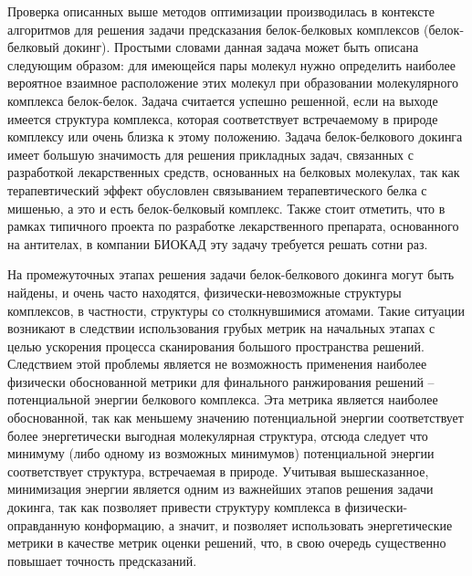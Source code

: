   Проверка описанных выше методов оптимизации производилась в контексте алгоритмов для решения задачи предсказания белок-белковых комплексов (белок-белковый докинг). Простыми словами данная задача может быть описана следующим образом: для имеющейся пары молекул нужно определить наиболее вероятное взаимное расположение этих молекул при образовании молекулярного комплекса белок-белок. Задача считается успешно решенной, если на выходе имеется структура комплекса, которая соответствует встречаемому в природе комплексу или очень близка к этому положению. Задача белок-белкового докинга имеет большую значимость для решения прикладных задач, связанных с разработкой лекарственных средств, основанных на белковых молекулах, так как терапевтический эффект обусловлен связыванием терапевтического белка с мишенью, а это и есть белок-белковый комплекс. Также стоит отметить, что в рамках типичного проекта по разработке лекарственного препарата, основанного на антителах, в компании БИОКАД эту задачу требуется решать сотни раз.

  На промежуточных этапах решения задачи белок-белкового докинга могут быть найдены, и очень часто находятся, физически-невозможные структуры комплексов, в частности, структуры со столкнувшимися атомами. Такие ситуации возникают в следствии использования грубых метрик на начальных этапах с целью ускорения процесса сканирования большого пространства решений. Следствием этой проблемы является не возможность применения наиболее физически обоснованной метрики для финального ранжирования решений -- потенциальной энергии белкового комплекса. Эта метрика является наиболее обоснованной, так как меньшему значению потенциальной энергии соответствует более энергетически выгодная молекулярная структура, отсюда следует что минимуму (либо одному из возможных минимумов) потенциальной энергии соответствует структура, встречаемая в природе. Учитывая вышесказанное, минимизация энергии является одним из важнейших этапов решения задачи докинга, так как позволяет привести структуру комплекса в физически-оправданную конформацию, а значит, и позволяет использовать энергетические метрики в качестве метрик оценки решений, что, в свою очередь существенно повышает точность предсказаний. 

